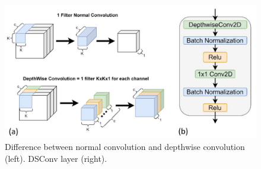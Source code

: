 \documentclass[conference]{IEEEtran}
\begin{document}
\begin{figure}[t]
\centering
\includegraphics[scale=0.56]{confronto3}
\caption{Difference between normal convolution and depthwise convolution (left). DSConv layer (right).}
\end{figure}
\end{document}

